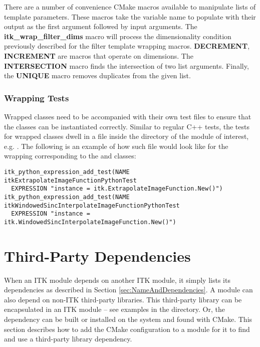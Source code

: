 There are a number of convenience CMake macros available to manipulate lists
of template parameters. These macros take the variable name to populate with
their output as the first argument followed by input arguments. The
\textbf{itk\_wrap\_filter\_dims} macro will process the dimensionality
condition previously described for the filter template wrapping macros.
\textbf{DECREMENT}, \textbf{INCREMENT} are macros that operate on dimensions.
The \textbf{INTERSECTION} macro finds the intersection of two list arguments.
Finally, the \textbf{UNIQUE} macro removes duplicates from the given list.


\subsubsection{Wrapping Tests}

Wrapped classes need to be accompanied with their own test files to ensure that
the classes can be instantiated correctly. Similar to regular C++ tests, the
tests for wrapped classes dwell in a  file inside the
 directory of the module of interest, e.g.
. The
following is an example of how such file would look like for the wrapping
corresponding to the  and
 classes:

\begin{verbatim}
itk_python_expression_add_test(NAME itkExtrapolateImageFunctionPythonTest
  EXPRESSION "instance = itk.ExtrapolateImageFunction.New()")
itk_python_expression_add_test(NAME itkWindowedSincInterpolateImageFunctionPythonTest
  EXPRESSION "instance = itk.WindowedSincInterpolateImageFunction.New()")
\end{verbatim}


\section{Third-Party Dependencies}
\label{sec:ThirdParty}

When an ITK module depends on another ITK module, it simply lists its
dependencies as described in Section \ref{sec:NameAndDependencies}. A module
can also depend on non-ITK third-party libraries. This third-party library can
be encapsulated in an ITK module -- see examples in the
 directory. Or, the dependency can be built or
installed on the system and found with CMake. This section describes how to
add the CMake configuration to a module for it to find and use a third-party
library dependency.


